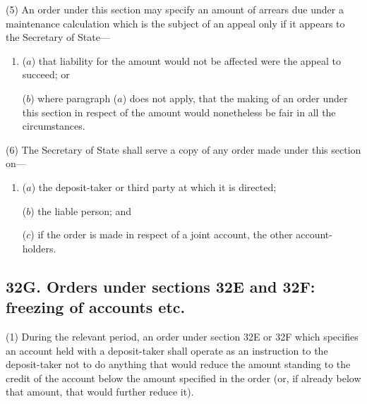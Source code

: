 \documentclass[12pt,a4paper]{article}
\begin{document}
(5)
An order under this section may specify an amount of arrears due under a maintenance calculation which is the subject of an appeal only if it appears to the Secretary of State---
\begin{enumerate}\item[]
($a$) that liability for the amount would not be affected were the appeal to succeed; or

($b$) where paragraph ($a$) does not apply, that the making of an order under this section in respect of the amount would nonetheless be fair in all the circumstances.
\end{enumerate}

(6) The Secretary of State shall serve a copy of any order made under this section on---
\begin{enumerate}\item[]
($a$) the deposit-taker or third party at which it is directed;

($b$) the liable person; and

($c$) if the order is made in respect of a joint account, the other account-holders.
\end{enumerate}


\subsection{32G. Orders under sections 32E and 32F: freezing of accounts etc.}

(1) During the relevant period, an order under section 32E or 32F which
specifies an account held with a deposit-taker shall operate as an instruction to the deposit-taker not to do anything that would reduce the amount standing to the credit of the account below the amount specified in the order (or, if already below that amount, that would further reduce it).
\end{document}
